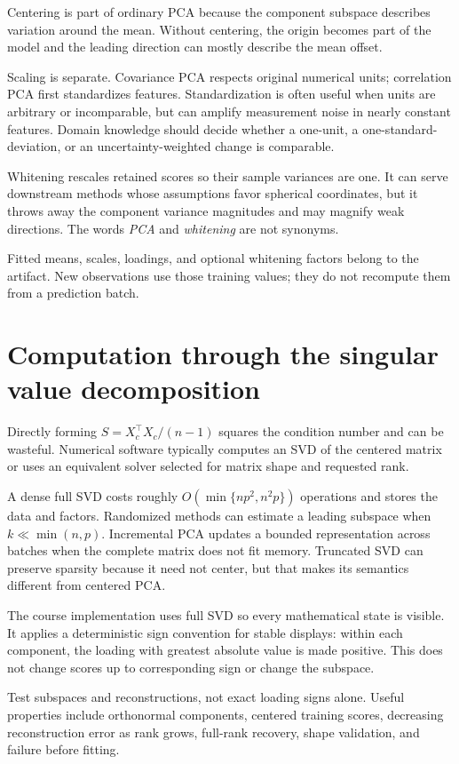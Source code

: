 Centering is part of ordinary PCA because the component subspace describes
variation around the mean. Without centering, the origin becomes part of the
model and the leading direction can mostly describe the mean offset.

Scaling is separate. Covariance PCA respects original numerical units;
correlation PCA first standardizes features. Standardization is often useful
when units are arbitrary or incomparable, but can amplify measurement noise in
nearly constant features. Domain knowledge should decide whether a one-unit, a
one-standard-deviation, or an uncertainty-weighted change is comparable.

Whitening rescales retained scores so their sample variances are one. It can
serve downstream methods whose assumptions favor spherical coordinates, but it
throws away the component variance magnitudes and may magnify weak directions.
The words \emph{PCA} and \emph{whitening} are not synonyms.

Fitted means, scales, loadings, and optional whitening factors belong to the
artifact. New observations use those training values; they do not recompute
them from a prediction batch.

\section{Computation through the singular value decomposition}

Directly forming $S=X_c^\top X_c/(n-1)$ squares the condition number and can be
wasteful. Numerical software typically computes an SVD of the centered matrix
or uses an equivalent solver selected for matrix shape and requested rank.

A dense full SVD costs roughly
$O(\min\{np^2,n^2p\})$ operations and stores the data and factors. Randomized
methods can estimate a leading subspace when $k\ll\min(n,p)$. Incremental PCA
updates a bounded representation across batches when the complete matrix does
not fit memory. Truncated SVD can preserve sparsity because it need not center,
but that makes its semantics different from centered PCA.

The course implementation uses full SVD so every mathematical state is visible.
It applies a deterministic sign convention for stable displays: within each
component, the loading with greatest absolute value is made positive. This does
not change scores up to corresponding sign or change the subspace.

\begin{professionalbox}
Test subspaces and reconstructions, not exact loading signs alone. Useful
properties include orthonormal components, centered training scores, decreasing
reconstruction error as rank grows, full-rank recovery, shape validation, and
failure before fitting.
\end{professionalbox}

